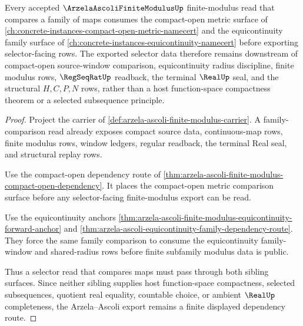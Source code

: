 \begin{theorem}
\label{thm:arzela-ascoli-finite-modulus-compact-open-equicontinuity-dependency-route}
Every accepted $\ArzelaAscoliFiniteModulusUp$ finite-modulus read that compares a family of maps consumes the compact-open metric surface of \autoref{ch:concrete-instances-compact-open-metric-namecert} and the equicontinuity family surface of \autoref{ch:concrete-instances-equicontinuity-namecert} before exporting selector-facing rows. The exported selector data therefore remains downstream of compact-open source-window comparison, equicontinuity radius discipline, finite modulus rows, $\RegSeqRatUp$ readback, the terminal $\RealUp$ seal, and the structural $H,C,P,N$ rows, rather than a host function-space compactness theorem or a selected subsequence principle.
\end{theorem}
\begin{proof}
Project the carrier of \autoref{def:arzela-ascoli-finite-modulus-carrier}. A family-comparison read already exposes compact source data, continuous-map rows, finite modulus rows, window ledgers, regular readback, the terminal Real seal, and structural replay rows.

Use the compact-open dependency route of \autoref{thm:arzela-ascoli-finite-modulus-compact-open-dependency}. It places the compact-open metric comparison surface before any selector-facing finite-modulus export can be read.

Use the equicontinuity anchors \autoref{thm:arzela-ascoli-finite-modulus-equicontinuity-forward-anchor} and \autoref{thm:arzela-ascoli-equicontinuity-family-dependency-route}. They force the same family comparison to consume the equicontinuity family-window and shared-radius rows before finite subfamily modulus data is public.

Thus a selector read that compares maps must pass through both sibling surfaces. Since neither sibling supplies host function-space compactness, selected subsequences, quotient real equality, countable choice, or ambient $\RealUp$ completeness, the Arzela--Ascoli export remains a finite displayed dependency route.
\end{proof}
